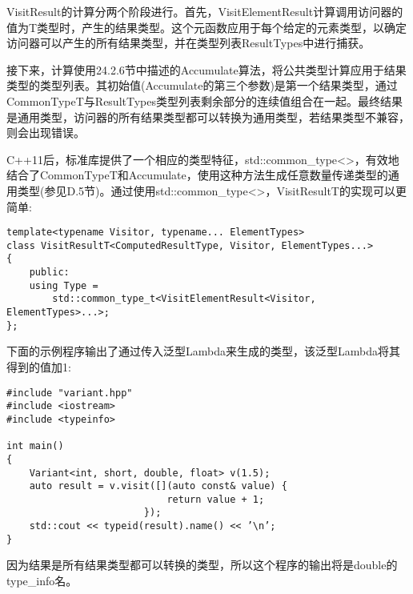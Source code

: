 VisitResult的计算分两个阶段进行。首先，VisitElementResult计算调用访问器的值为T类型时，产生的结果类型。这个元函数应用于每个给定的元素类型，以确定访问器可以产生的所有结果类型，并在类型列表ResultTypes中进行捕获。

接下来，计算使用24.2.6节中描述的Accumulate算法，将公共类型计算应用于结果类型的类型列表。其初始值(Accumulate的第三个参数)是第一个结果类型，通过CommonTypeT与ResultTypes类型列表剩余部分的连续值组合在一起。最终结果是通用类型，访问器的所有结果类型都可以转换为通用类型，若结果类型不兼容，则会出现错误。

C++11后，标准库提供了一个相应的类型特征，std::common\_type<>，有效地结合了CommonTypeT和Accumulate，使用这种方法生成任意数量传递类型的通用类型(参见D.5节)。通过使用std::common\_type<>，VisitResultT的实现可以更简单:

\begin{lstlisting}[style=styleCXX]
template<typename Visitor, typename... ElementTypes>
class VisitResultT<ComputedResultType, Visitor, ElementTypes...>
{
	public:
	using Type =
		std::common_type_t<VisitElementResult<Visitor, ElementTypes>...>;
};
\end{lstlisting}

下面的示例程序输出了通过传入泛型Lambda来生成的类型，该泛型Lambda将其得到的值加1:

\begin{lstlisting}[style=styleCXX]
#include "variant.hpp"
#include <iostream>
#include <typeinfo>

int main()
{
	Variant<int, short, double, float> v(1.5);
	auto result = v.visit([](auto const& value) {
							return value + 1;
						});
	std::cout << typeid(result).name() << ’\n’;
}
\end{lstlisting}

因为结果是所有结果类型都可以转换的类型，所以这个程序的输出将是double的type\_info名。







